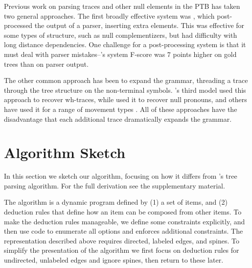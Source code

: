 Previous work on parsing traces and other null elements in the PTB has taken two general approaches.
The first broadly effective system was \textcite{Johnson:2002}, which post-processed the output of a parser, inserting extra elements.
This was effective for some types of structure, such as null complementizers, but had difficulty with long distance dependencies.
One challenge for a post-processing system is that it must deal with parser mistakes--\textcite{Johnson:2002}'s system F-score was $7$ points higher on gold trees than on parser output.

The other common approach has been to expand the grammar, threading a trace through the tree structure on the non-terminal symbols.
\textcite{Collins:1997}'s third model used this approach to recover wh-traces, while \textcite{cai-chiang-goldberg:2011} used it to recover null pronouns, and others have used it for a range of movement types \parencite{dienes-dubey:2003,schmid:2006}.
All of these approaches have the disadvantage that each additional trace dramatically expands the grammar.


\section{Algorithm Sketch}

\newlength\vertSmall
\newlength\vertBig
\newlength\vertBigger
\newlength{}
\newlength\coordGap


In this section we sketch our algorithm, focusing on how it differs from \textcite{ec}'s tree parsing algorithm.
For the full derivation see the supplementary material.

The algorithm is a dynamic program defined by (1) a set of items, and (2) deduction rules that define how an item can be composed from other items.
To make the deduction rules manageable, we define some constraints explicitly, and then use code to enumerate all options and enforces additional constraints.
The representation described above requires directed, labeled edges, and spines.
To simplify the presentation of the algorithm we first focus on deduction rules for undirected, unlabeled edges and ignore spines, then return to these later.

